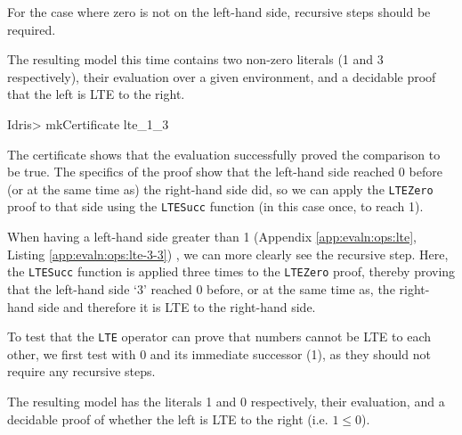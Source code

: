         \newpage
        
        
        
        For the case where zero is not on the left-hand side, recursive steps should be required.
        
        
        The resulting model this time contains two non-zero literals (1 and 3 respectively), their evaluation over a given environment, and a decidable proof that the left is LTE to the right.
        
        \begin{code}
Idris> mkCertificate lte_1_3
        \end{code}
        
        The certificate shows that the evaluation successfully proved the comparison to be true. The specifics of the proof show that the left-hand side reached 0 before (or at the same time as) the right-hand side did, so we can apply the \texttt{LTEZero} proof to that side using the \texttt{LTESucc} function (in this case once, to reach 1).
        
        
        When having a left-hand side greater than 1 (Appendix \ref{app:evaln:ops:lte}, Listing \ref{app:evaln:ops:lte-3-3}) , we can more clearly see the recursive step. Here, the \texttt{LTESucc} function is applied three times to the \texttt{LTEZero} proof, thereby proving that the left-hand side `3' reached 0 before, or at the same time as, the right-hand side and therefore it is LTE to the right-hand side.
        
        
        
        To test that the \texttt{LTE} operator can prove that numbers cannot be LTE to each other, we first test with 0 and its immediate successor (1), as they should not require any recursive steps.
        
        \newpage
        
        
        The resulting \Idris model has the literals 1 and 0 respectively, their evaluation, and a decidable proof of whether the left is LTE to the right (i.e. $1 \leq 0$).
        
